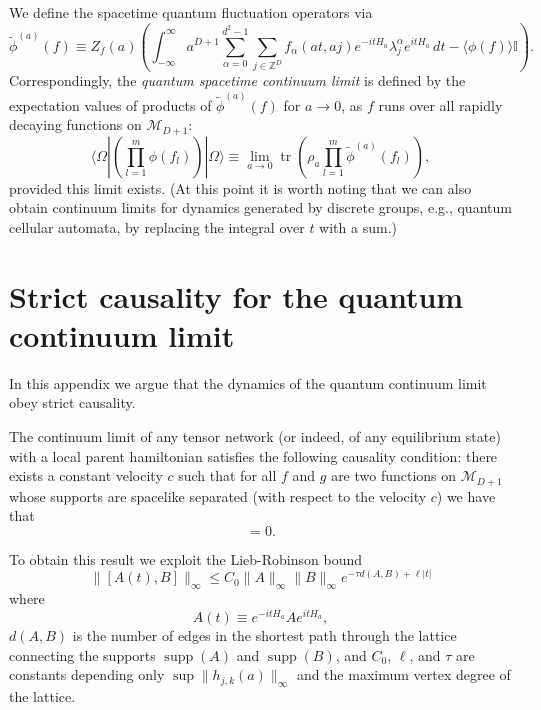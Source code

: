 \documentclass[prl,twocolumn,lengthcheck,superscriptaddress]{revtex4-1}
\newcommand{\tr}{\operatorname{tr}}
\newcommand{\supp}{\operatorname{supp}}
\theoremstyle{definition}
\theoremstyle{remark}
\begin{document}
We define the spacetime quantum fluctuation operators via
\begin{equation}
	\widetilde{\phi}^{(a)}(f) \equiv Z_f(a)\left( \int_{-\infty}^\infty  a^{D+1}\sum_{\alpha = 0}^{d^2-1}\sum_{j\in \mathbb{Z}^D} f_\alpha(at, aj) e^{-itH_a}\lambda^\alpha_je^{itH_a} \,dt - \langle\phi(f)\rangle\mathbb{I}\right).
\end{equation}
Correspondingly, the \emph{quantum spacetime continuum limit} is defined by the expectation values of products of $\widetilde{\phi}^{(a)}(f)$ for $a\rightarrow 0$, as $f$ runs over all rapidly decaying functions on $\mathcal{M}_{D+1}$:
\begin{equation}\label{eq:qsctslimit}
	\langle\Omega|\left(\prod_{l=1}^m\widehat{\phi}(f_l)\right)|\Omega\rangle \equiv \lim_{a\rightarrow 0} \tr\left(\rho_a \prod_{l=1}^m\widetilde{\phi}^{(a)}(f_l)\right),
\end{equation}
provided this limit exists.
(At this point it is worth noting that we can also obtain continuum limits for dynamics generated by discrete groups, e.g., quantum cellular automata, by replacing the integral over $t$ with a sum.)

\section{Strict causality for the quantum continuum limit}
In this appendix we argue that the dynamics of the quantum continuum limit obey strict causality. 

The continuum limit of any tensor network (or indeed, of any equilibrium state) with a local parent hamiltonian satisfies the following causality condition: there exists a constant velocity $c$ such that for all $f$ and $g$ are two functions on $\mathcal{M}_{D+1}$ whose supports are spacelike separated (with respect to the velocity $c$) we have that
\begin{equation}
	[\widehat{\phi}(f), \widehat{\phi}(g)]  = 0.
\end{equation}

To obtain this result we exploit the Lieb-Robinson bound
\begin{equation}
	\| [A(t), B] \|_{\infty} \le C_0 \|A\|_\infty \|B\|_\infty e^{-{\tau} d(A,B) + \ell |t|}
\end{equation}
where
\begin{equation}
	A(t) \equiv e^{-itH_a} A e^{itH_a},
\end{equation} 
$d(A,B)$ is the number of edges in the shortest path through the lattice connecting the supports $\supp(A)$ and $\supp(B)$, and $C_0$, $\ell$, and $\tau$ are constants depending only $\sup \|h_{j,k}(a)\|_\infty$ and the maximum vertex degree of the lattice.
\end{document}
